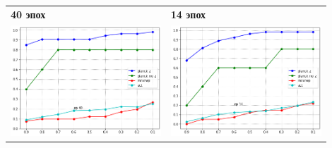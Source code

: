 \documentclass{article}
\begin{document}
\begin{enumerate}
    \begin{table}[h!]
        \begin{tabular}{p{0.45\linewidth}p{0.45\linewidth}}
            \textbf{40 эпох} & \textbf{14 эпох}\\
            \includegraphics[width=\linewidth]{recall40} & \includegraphics[width=\linewidth]{recall14}\\ 

\end{tabular}
\end{table}
\end{enumerate}
\end{document}
